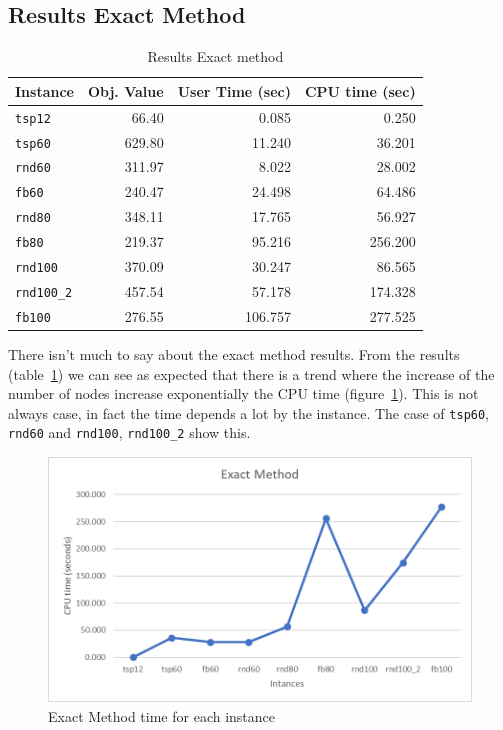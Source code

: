 \newpage
\subsection{Results Exact Method}
	\begin{table}[h]
		\centering
		\begin{tabular}{lrrr}
			\toprule
			\textbf{Instance} & \textbf{Obj. Value} & \textbf{User Time (sec)} & \textbf{CPU time (sec)} \\
			\midrule
			\verb|tsp12| & 66.40 & 0.085 & 0.250 \\
			\verb|tsp60| & 629.80 & 11.240 & 36.201 \\
			\verb|rnd60| & 311.97 & 8.022 & 28.002 \\
			\verb|fb60|	& 240.47 & 24.498 & 64.486 \\
			\verb|rnd80| & 348.11 & 17.765 & 56.927 \\
			\verb|fb80| & 219.37 & 95.216 & 256.200 \\
			\verb|rnd100| & 370.09 & 30.247 & 86.565 \\
			\verb|rnd100_2| & 457.54 & 57.178 & 174.328 \\
			\verb|fb100| & 276.55 & 106.757 & 277.525 \\
			\bottomrule
		\end{tabular}
		\caption{\label{tab:ExactMethodResults} Results Exact method}
	\end{table}

	There isn't much to say about the exact method results. From the results (table~\ref{tab:ExactMethodResults}) we can see as expected that there is a trend where the increase of the number of nodes increase exponentially the CPU time (figure~\ref{fig:em-time}). This is not always case, in fact the time depends a lot by the instance. The case of \verb|tsp60|, \verb|rnd60| and \verb|rnd100|, 
	\verb|rnd100_2| show this.
	
	\begin{figure} [hb]
		\centering
		\includegraphics[width=\linewidth]{img/EM-results}
		\caption{Exact Method time for each instance}
		\label{fig:em-time}
	\end{figure}
	
